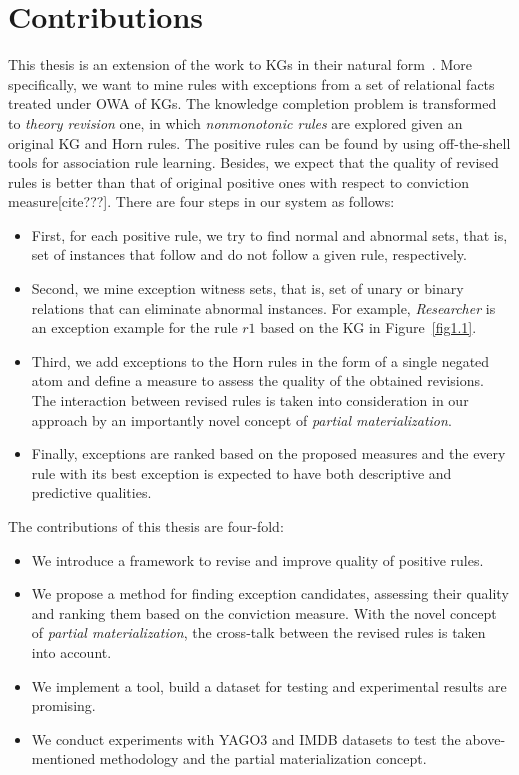 \section{Contributions}

This thesis is an extension of the work to KGs in their natural form~\cite{ref12}. More specifically, we want to mine rules with exceptions from a set of relational facts treated under OWA of KGs. The knowledge completion problem is transformed to \textit{theory revision} one, in which \textit{nonmonotonic rules} are explored given an original KG and Horn rules. The positive rules can be found by using off-the-shell tools for association rule learning. Besides, we expect that the quality of revised rules is better than that of original positive ones with respect to conviction measure[cite???]. There are four steps in our system as follows:

\begin{itemize}
\item First, for each positive rule, we try to find normal and abnormal sets, that is, set of instances that follow and do not follow a given rule, respectively.
\item Second, we mine exception witness sets, that is, set of unary or binary relations that can eliminate abnormal instances. For example, \textit{Researcher} is an exception example for the rule $r1$ based on the KG in Figure~\ref{fig1.1}.
\item Third, we add exceptions to the Horn rules in the form of a single negated atom and define a measure to assess the quality of the obtained revisions. The interaction between revised rules is taken into consideration in our approach by an importantly novel concept of \textit{partial materialization}.
\item Finally, exceptions are ranked based on the proposed measures and the every rule with its best exception is expected to have both descriptive and predictive qualities.
\end{itemize}

The contributions of this thesis are four-fold:

\begin{itemize}
\item We introduce a framework to revise and improve quality of positive rules.
\item We propose a method for finding exception candidates, assessing their quality and ranking them based on the conviction measure. With the novel concept of \textit{partial materialization}, the cross-talk between the revised rules is taken into account.
\item We implement a tool, build a dataset for testing and experimental results are promising.
\item We conduct experiments with YAGO3 and IMDB datasets to test the above-mentioned methodology and the partial materialization concept.
\end{itemize}

